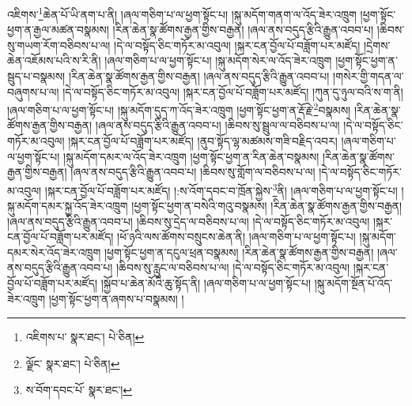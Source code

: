འཇིགས་\footnote{འཇིགས་པ་  སྣར་ཐང་།  པེ་ཅིན། }ཆེན་པོ་ཡི་ནག་པ་ནི། །ཞལ་གཅིག་པ་ལ་ཕྱག་སྟོང་པ། །སྐུ་མདོག་གནག་ལ་འོད་ཟེར་འཁྲུག །ཕྱག་སྟོང་ཕྱག་ན་རྒྱལ་མཚན་བསྣམས། །རིན་ཆེན་སྣ་ཚོགས་རྒྱན་གྱིས་བརྒྱན། །ཞལ་ནས་བདུད་རྩིའི་རྒྱུན་འབབ་པ། །ཆིབས་སུ་གཡག་རོག་བཅིབས་པ་ལ། །དེ་ལ་བསྟོད་ཅིང་གཏོར་མ་འབུལ། །སྐར་ངན་བྱོལ་པོ་བཟློག་པར་མཛོད། །དྲེགས་ཆེན་འཇོམས་པའི་ས་རི་ནི། །ཞལ་གཅིག་པ་ལ་ཕྱག་སྟོང་པ། །སྐུ་མདོག་སེར་ལ་འོད་ཟེར་འཁྲུག །ཕྱག་སྟོང་ཕྱག་ན་སྦུད་པ་བསྣམས། །རིན་ཆེན་སྣ་ཚོགས་རྒྱན་གྱིས་བརྒྱན། །ཞལ་ནས་བདུད་རྩིའི་རྒྱུན་འབབ་པ། །གསེར་གྱི་གདན་ལ་བཞུགས་པ་ལ། །དེ་ལ་བསྟོད་ཅིང་གཏོར་མ་འབུལ། །སྐར་ངན་བྱོལ་པོ་བཟློག་པར་མཛོད། །ཀུན་དུ་ཉུལ་བའི་ས་ག་ནི། །ཞལ་གཅིག་པ་ལ་ཕྱག་སྟོང་པ། །སྐུ་མདོག་དུད་ཀ་འོད་ཟེར་འཁྲུག །ཕྱག་སྟོང་ཕྱག་ན་རྡོ་རྗེ་\footnote{ལྗོང་  སྣར་ཐང་།  པེ་ཅིན། }བསྣམས། །རིན་ཆེན་སྣ་ཚོགས་རྒྱན་གྱིས་བརྒྱན། །ཞལ་ནས་བདུད་རྩིའི་རྒྱུན་འབབ་པ། །ཆིབས་སུ་སྦྲུལ་ལ་བཅིབས་པ་ལ། །དེ་ལ་བསྟོད་ཅིང་གཏོར་མ་འབུལ། །སྐར་ངན་བྱོལ་པོ་བཟློག་པར་མཛོད། །ནུབ་སྟོད་ལྷ་མཚམས་གཟི་བརྗིད་འབར། །ཞལ་གཅིག་པ་ལ་ཕྱག་སྟོང་པ། །སྐུ་མདོག་དམར་ལ་འོད་ཟེར་འཁྲུག །ཕྱག་སྟོང་ཕྱག་ན་རིན་ཆེན་བསྣམས། །རིན་ཆེན་སྣ་ཚོགས་རྒྱན་གྱིས་བརྒྱན། །ཞལ་ནས་བདུད་རྩིའི་རྒྱུན་འབབ་པ། །ཆིབས་སུ་གློག་ལ་བཅིབས་པ་ལ། །དེ་ལ་བསྟོད་ཅིང་གཏོར་མ་འབུལ། །སྐར་ངན་བྱོལ་པོ་བཟློག་པར་མཛོད། །:ས་འོག་དབང་བ་ཁྲོན་སྐྱེས་\footnote{ས་བོག་དབང་པོ་  སྣར་ཐང་། }ནི། །ཞལ་གཅིག་པ་ལ་ཕྱག་སྟོང་པ། །སྐུ་མདོག་དམར་སྐྱ་འོད་ཟེར་འཁྲུག །ཕྱག་སྟོང་ཕྱག་ན་བསེའི་གའུ་བསྣམས། །རིན་ཆེན་སྣ་ཚོགས་རྒྱན་གྱིས་བརྒྱན། །ཞལ་ནས་བདུད་རྩིའི་རྒྱུན་འབབ་པ། །ཆིབས་སུ་དྲེད་ལ་བཅིབས་པ་ལ། །དེ་ལ་བསྟོད་ཅིང་གཏོར་མ་འབུལ། །སྐར་ངན་བྱོལ་པོ་བཟློག་པར་མཛོད། །ཕོ་ཉའི་ལས་ཚོགས་བསྲུངས་ཆེན་ནི། །ཞལ་གཅིག་པ་ལ་ཕྱག་སྟོང་པ། །སྐུ་མདོག་དམར་སེར་འོད་ཟེར་འཁྲུག །ཕྱག་སྟོང་ཕྱག་ན་དངུལ་ཕྲན་བསྣམས། །རིན་ཆེན་སྣ་ཚོགས་རྒྱན་གྱིས་བརྒྱན། །ཞལ་ནས་བདུད་རྩིའི་རྒྱུན་འབབ་པ། །ཆིབས་སུ་རླུང་ལ་བཅིབས་པ་ལ། །དེ་ལ་བསྟོད་ཅིང་གཏོར་མ་འབུལ། །སྐར་ངན་བྱོལ་པོ་བཟློག་པར་མཛོད། །སྐྱོབ་པ་ཆེན་མོའི་ཆུ་སྟོད་ནི། །ཞལ་གཅིག་པ་ལ་ཕྱག་སྟོང་པ། །སྐུ་མདོག་སྔོན་པོ་འོད་ཟེར་འཁྲུག །ཕྱག་སྟོང་ཕྱག་ན་ཞགས་པ་བསྣམས། །
